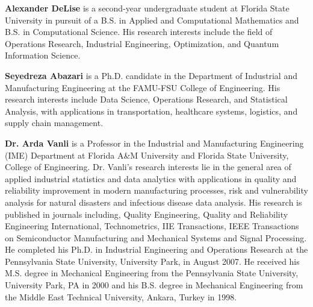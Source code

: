 \documentclass{article}
\begin{document}
\printbibliography[heading=subbibintoc, title={References}]


\begin{ieombiography}
  \textbf{Alexander DeLise} is a second-year undergraduate student at Florida State University in pursuit of a B.S. in Applied and Computational Mathematics and B.S. in Computational Science. His research interests include the field of Operations Research, Industrial Engineering, Optimization, and Quantum Information Science. 

  \noindent \textbf{Seyedreza Abazari} is a Ph.D. candidate in the Department of Industrial and Manufacturing Engineering at the FAMU-FSU College of Engineering. His research interests include Data Science, Operations Research, and Statistical Analysis, with applications in transportation, healthcare systems, logistics, and supply chain management.

  \noindent \textbf{Dr. Arda Vanli} is a Professor in the Industrial and Manufacturing Engineering (IME) Department at Florida A\&M University and Florida State University, College of Engineering. Dr. Vanli's research interests lie in the general area of applied industrial statistics and data analytics with applications in quality and reliability improvement in modern manufacturing processes, risk and vulnerability analysis for natural disasters and infectious disease data analysis. His research is published in journals including, Quality Engineering, Quality and Reliability Engineering International, Technometrics, IIE Transactions, IEEE Transactions on Semiconductor Manufacturing and Mechanical Systems and Signal Processing. He completed his Ph.D. in Industrial Engineering and Operations Research at the Pennsylvania State University, University Park, in August 2007. He received his M.S. degree in Mechanical Engineering from the Pennsylvania State University, University Park, PA in 2000 and his B.S. degree in Mechanical Engineering from the Middle East Technical University, Ankara, Turkey in 1998.
\end{ieombiography}
 
\end{document}
